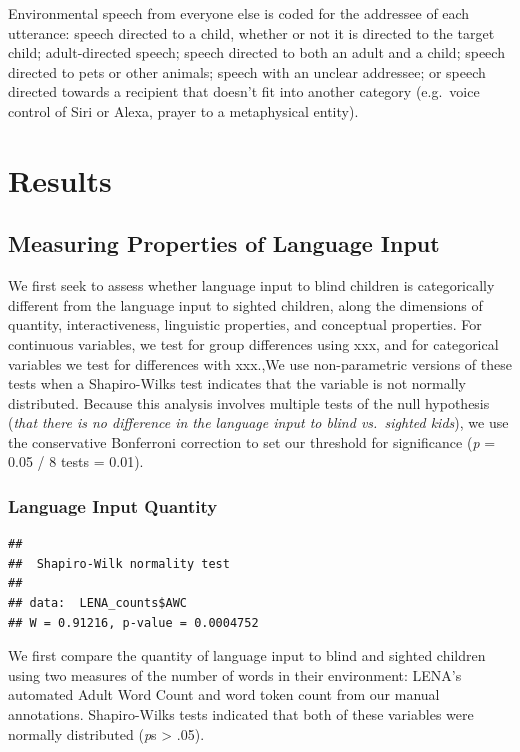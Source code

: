 \documentclass[
  man,floatsintext]{apa6}
\begin{document}
Environmental speech from everyone else is coded for the addressee of each utterance: speech directed to a child, whether or not it is directed to the target child; adult-directed speech; speech directed to both an adult and a child; speech directed to pets or other animals; speech with an unclear addressee; or speech directed towards a recipient that doesn't fit into another category (e.g.~voice control of Siri or Alexa, prayer to a metaphysical entity).

\hypertarget{results}{%
\section{Results}\label{results}}

\hypertarget{measuring-properties-of-language-input}{%
\subsection{Measuring Properties of Language Input}\label{measuring-properties-of-language-input}}

We first seek to assess whether language input to blind children is categorically different from the language input to sighted children, along the dimensions of quantity, interactiveness, linguistic properties, and conceptual properties. For continuous variables, we test for group differences using xxx, and for categorical variables we test for differences with xxx.,We use non-parametric versions of these tests when a Shapiro-Wilks test indicates that the variable is not normally distributed. Because this analysis involves multiple tests of the null hypothesis (\emph{that there is no difference in the language input to blind vs.~sighted kids}), we use the conservative Bonferroni correction to set our threshold for significance (\emph{p} = 0.05 / 8 tests = 0.01).

\hypertarget{language-input-quantity}{%
\subsubsection{Language Input Quantity}\label{language-input-quantity}}

\begin{verbatim}
## 
##  Shapiro-Wilk normality test
## 
## data:  LENA_counts$AWC
## W = 0.91216, p-value = 0.0004752
\end{verbatim}

We first compare the quantity of language input to blind and sighted children using two measures of the number of words in their environment: LENA's automated Adult Word Count and word token count from our manual annotations. Shapiro-Wilks tests indicated that both of these variables were normally distributed (\emph{p}s \textgreater{} .05).
\end{document}
